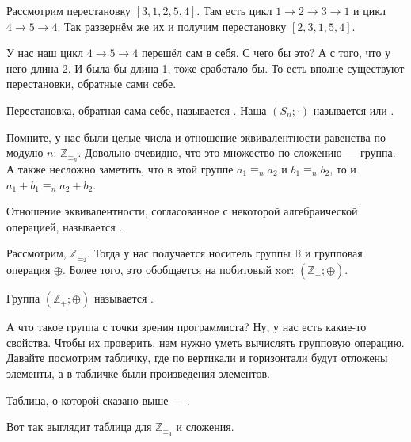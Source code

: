 \documentclass{article}
\begin{document}
\begin{itemize}
\begin{Proof}
        \end{Proof}
        \begin{Example}
            Рассмотрим перестановку $[3,1,2,5,4]$. Там есть цикл $1\to2\to3\to1$ и цикл $4\to5\to4$. Так развернём же их и получим перестановку $[2,3,1,5,4]$.
        \end{Example}
        \begin{Comment}
            У нас наш цикл $4\to5\to4$ перешёл сам в себя. С чего бы это? А с того, что у него длина 2. И была бы длина 1, тоже сработало бы. То есть вполне существуют перестановки, обратные сами себе.
        \end{Comment}
        \dfn Перестановка, обратная сама себе, называется .
        \dfn Наша $(S_n;\cdot)$ называется  или .
        \begin{Example}
            Помните, у нас были целые числа и отношение эквивалентности равенства по модулю $n$: $\mathbb Z_{\equiv_n}$. Довольно очевидно, что это множество по сложению --- группа. А также несложно заметить, что в этой группе $a_1\equiv_na_2$ и $b_1\equiv_nb_2$, то и $a_1+b_1\equiv_na_2+b_2$.
        \end{Example}
        \dfn Отношение эквивалентности, согласованное с некоторой алгебраической операцией, называется .
        \begin{Example}
            Рассмотрим, $\mathbb Z_{\equiv_2}$. Тогда у нас получается носитель группы $\mathbb B$ и групповая операция $\oplus$. Более того, это обобщается на побитовый xor: $(\mathbb Z_+;\oplus)$.
        \end{Example}
        \dfn Группа $(\mathbb Z_+;\oplus)$ называется .
        \begin{Comment}
            А что такое группа с точки зрения программиста? Ну, у нас есть какие-то свойства. Чтобы их проверить, нам нужно уметь вычислять групповую операцию. Давайте посмотрим табличку, где по вертикали и горизонтали будут отложены элементы, а в табличке были произведения элементов.
        \end{Comment}
        \dfn Таблица, о которой сказано выше --- .
        \begin{Example}
            Вот так выглядит таблица для $\mathbb Z_{\equiv_4}$ и сложения.
            \begin{center}
                \begin{tabular}{|c|cccc|}

\end{tabular}
\end{center}
\end{Example}
\end{itemize}
\end{document}
